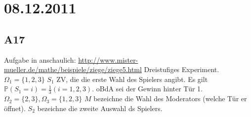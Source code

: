 \documentclass[a4paper,11pt,notitlepage]{report}
\newcommand{\Prim}{{\ensuremath{\mathbb{P}}}}
\begin{document}
\chapter{08.12.2011}
\section{A17}
Aufgabe in anschaulich: \url{http://www.mister-mueller.de/mathe/beispiele/ziege/ziege5.html}
\newline
Dreistufiges Experiment. \newline
$\Omega_1=\{1,2,3\}$ \newline
$S_1$ ZV, die die erste Wahl des Spielers angibt. \newline
Es gilt $\Prim(S_1 = i) = \frac{1}{3} (i = 1,2,3)$. \newline
oBdA sei der Gewinn hinter Tür 1. \newline
$\Omega_2 = \{2,3\}, \Omega_3 = \{1,2,3\}$ \newline
$M$ bezeichne die Wahl des Moderators (welche Tür er öffnet). \newline
$S_2$ bezeichne die zweite Auswahl ds Spielers.
\end{document}
